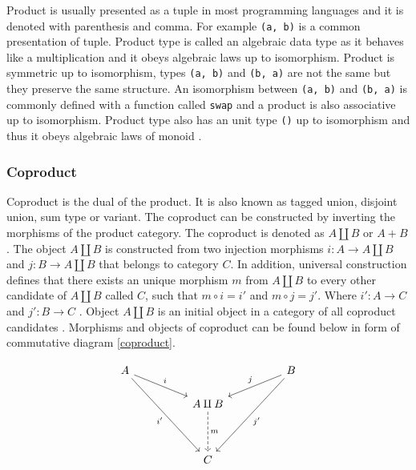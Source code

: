 \documentclass[article]{aaltoseries}
\begin{document}
    Product is usually presented as a tuple in most programming languages and it
    is denoted with parenthesis and comma. For example \lstinline|(a, b)| is a
    common presentation of tuple. Product type is called an algebraic data type
    as it behaves like a multiplication and it obeys algebraic laws up to
    isomorphism. Product is symmetric up to isomorphism, types
    \lstinline|(a, b)| and \lstinline|(b, a)| are not the same but they preserve
    the same structure. An isomorphism between \lstinline|(a, b)| and \lstinline|(b, a)|
    is commonly defined with a function called \lstinline|swap| and a product is
    also associative up to isomorphism. Product type also has an unit type
    \lstinline|()| up to isomorphism and thus it obeys algebraic laws of monoid
    \cite{barr1990category}.


  \subsubsection{Coproduct}
    Coproduct is the dual of the product. It is also known as tagged union,
    disjoint union, sum type or variant. The coproduct can be constructed by
    inverting the morphisms of the product category. The coproduct is denoted as
    $A \amalg B$ or $A + B$. The object $A \amalg B$ is constructed from two
    injection morphisms $i : A \rightarrow A \amalg B$ and $j : B \rightarrow A
    \amalg B$ that belongs to category $C$. In addition, universal construction
    defines that there exists an unique morphism $m$ from $A \amalg B$ to every
    other candidate of $A \amalg B$ called $C$, such that $m \circ i = i'$ and
    $m \circ j = j'$. Where $i' : A \rightarrow C$ and $j' : B \rightarrow C$
    \cite{barr1990category, pierce1991basic}. Object $A \amalg B$ is an initial
    object in a category of all coproduct candidates \cite{pierce1991basic}.
    Morphisms and objects of coproduct can be found below in form of commutative
    diagram \ref{coproduct}.

    \begin{equation}
      \label{coproduct}
      \begin{tikzcd}[row sep=huge, column sep=huge]
        A \arrow[dr, "i"]
        \arrow[ddr, "i'"']
        &
        & B \arrow[dl, "j"']
        \arrow[ddl, "j'"] \\
        [-2em] & A \amalg B \arrow[d, dashed, "m"]
        & \\
        & C
        &
      \end{tikzcd}
    \end{equation}
\end{document}
